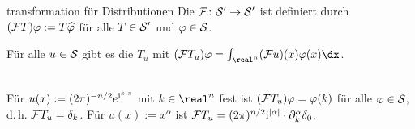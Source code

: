 \begin{Def}{transformation für Distributionen}
    Die  $\F\colon \S' \rightarrow \S'$ ist definiert durch
    $(\F T)\varphi := T \widehat{\varphi}$ für alle $T \in \S'$ und $\varphi \in \S$.
\end{Def}

\begin{Bem}
    Für alle $u \in \S$ gibt es die  $T_u$
    mit $(\F T_u) \varphi = \int_{\real^n} (\F u)(x) \varphi(x)\dx$.
\end{Bem}

\begin{Bsp}\\
    Für $u(x) := (2\pi)^{-n/2} e^{\iu\sp{k,x}}$ mit $k \in \real^n$ fest ist
    $(\F T_u)\varphi = \varphi(k)$ für alle $\varphi \in \S$, d.\,h. $\F T_u = \delta_k$.
    Für $u(x) := x^\alpha$ ist
    $\F T_u = (2\pi)^{n/2} \iu^{|\alpha|} \cdot \partial_k^\alpha \delta_0$.
\end{Bsp}

\pagebreak
